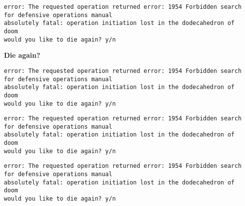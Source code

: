 \begin{verbatim}
error: The requested operation returned error: 1954 Forbidden search for defensive operations manual
absolutely fatal: operation initiation lost in the dodecahedron of doom
would you like to die again? y/n
\end{verbatim}

{\bf Die again?}\vspace{-1\baselineskip}
\begin{verbatim}
error: The requested operation returned error: 1954 Forbidden search for defensive operations manual
absolutely fatal: operation initiation lost in the dodecahedron of doom
would you like to die again? y/n
\end{verbatim}

\begin{verbatim}
error: The requested operation returned error: 1954 Forbidden search for defensive operations manual
absolutely fatal: operation initiation lost in the dodecahedron of doom
would you like to die again? y/n
\end{verbatim}

\begin{verbatim}
error: The requested operation returned error: 1954 Forbidden search for defensive operations manual
absolutely fatal: operation initiation lost in the dodecahedron of doom
would you like to die again? y/n
\end{verbatim}
